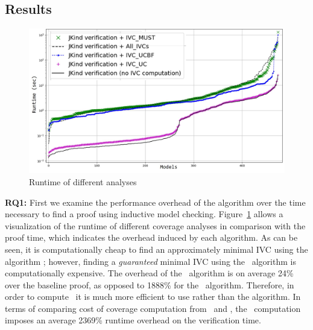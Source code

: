 \subsection{Results}
\label{sec:results}

\newcommand{\takeaway}[1]{
\vspace{6pt}
\noindent\fbox{\parbox{0.98\columnwidth}{#1}}
\vspace{6pt}
}

\begin{figure}
  \centering
  \includegraphics[width=\columnwidth]{figs/timing_analyses_all_sorted.jpg}
  \caption{Runtime of different analyses}\label{fig:runtimeall}
\end{figure}

%

\textbf{RQ1:} First we examine the performance overhead of the \ucalg algorithm over the time necessary to find a proof using inductive model checking. 
Figure~\ref{fig:runtimeall} allows a visualization of the runtime of different coverage analyses
in comparison with the proof time, which indicates the overhead induced by each algorithm.
As can be seen, it is computationally cheap to find an
approximately minimal IVC using the algorithm \ucalg; however, finding a {\em guaranteed}
minimal IVC using the \ucbfalg\ algorithm is computationally expensive. The overhead of the \ucalg\ algorithm is on average 24\% over the baseline proof, as opposed to 1888\% for the \ucbfalg\ algorithm.
Therefore, in order to compute \ivccov\, it is much more efficient to use \ucalg rather than the \ucbfalg algorithm. In terms of comparing cost of coverage computation from \ivccov\ and \mustcov ,
the \mustcov\ computation imposes an average 2369\% runtime overhead on the verification time.

